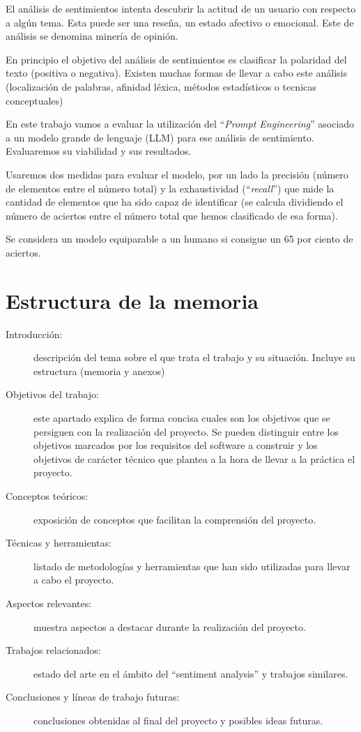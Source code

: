 
El análisis de sentimientos intenta descubrir la actitud de un usuario 
con respecto a algún tema.
Esta puede ser una reseña, un estado afectivo o emocional. 
Este de análisis se denomina minería de opinión.

En principio el objetivo del análisis de sentimientos es 
clasificar la polaridad del texto (positiva o negativa).
Existen muchas formas de llevar a cabo este análisis (localización de palabras, 
afinidad léxica, métodos estadísticos o tecnicas conceptuales)~\cite{Bannister2015}

En este trabajo vamos a evaluar la utilización del ``\emph{Prompt Engineering}'' 
asociado a un modelo grande de lenguaje (LLM) para ese análisis de sentimiento.
Evaluaremos su viabilidad y sus resultados. 

Usaremos dos medidas para evaluar el modelo, 
por un lado la precisión (número de elementos entre el número total) 
y la exhaustividad (``\emph{recall}'') que mide la cantidad de elementos 
que ha sido capaz de identificar 
(se calcula dividiendo el número de aciertos entre el número 
total que hemos clasificado de esa forma).

Se considera un modelo equiparable a un humano si consigue un 65 por ciento de aciertos.~\cite[p.~4]{Saif2013}
\newpage
\section{Estructura de la memoria}
\begin{description}
	\item[Introducción:] descripción del tema sobre el que trata el trabajo y su situación. 
    Incluye su estructura (memoria y anexos)
	\item[Objetivos del trabajo:] este apartado explica de forma concisa cuales son los objetivos 
    que se persiguen con la realización del proyecto. 
    Se pueden distinguir entre los objetivos marcados por los requisitos del software a construir y
     los objetivos de carácter técnico que plantea a la hora de llevar a la práctica el proyecto.
    \item[Conceptos teóricos:] exposición de conceptos que facilitan la comprensión del proyecto.
    \item[Técnicas y herramientas:] listado de metodologías y herramientas que han sido 
    utilizadas para llevar a cabo el proyecto.
    \item[Aspectos relevantes:] muestra aspectos a destacar durante la realización del proyecto.
    \item[Trabajos relacionados:] estado del arte en el ámbito del ``sentiment analysis'' y trabajos similares.
    \item[Conclusiones y líneas de trabajo futuras:] conclusiones obtenidas al final del proyecto y posibles ideas futuras.
\end{description}
